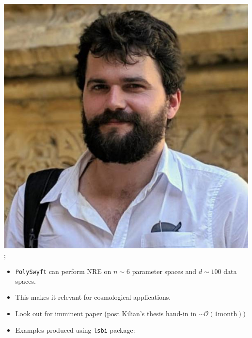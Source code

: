 \documentclass[aspectratio=169]{beamer}
\begin{document}
\begin{frame}
{        \includegraphics[width=0.10\textheight]{people/will_handley.jpg}%
    };
    \begin{itemize}
        \item \texttt{PolySwyft} can perform NRE on $n\sim 6$ parameter spaces and $d\sim100$ data spaces.
        \item This makes it relevant for cosmological applications.
        \item Look out for imminent paper (post Kilian's thesis hand-in in $\sim\mathcal{O}(1 \text{month}))$
        \item Examples produced using \texttt{lsbi} package: \\
    \end{itemize}
\end{frame}
\end{document}
